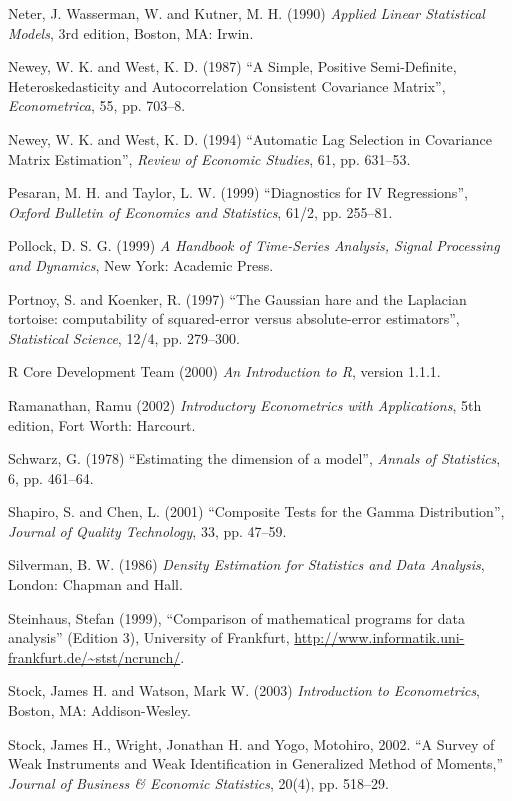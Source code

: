 \begin{thebibliography}
  Neter, J. Wasserman, W. and Kutner, M. H. (1990) \emph{Applied
    Linear Statistical Models}, 3rd edition, Boston, MA: Irwin.

  Newey, W. K. and West, K. D. (1987) ``A Simple, Positive
  Semi-Definite, Heteroskedasticity and Autocorrelation Consistent
  Covariance Matrix'', \emph{Econometrica}, 55, pp. 703--8.

  Newey, W. K. and West, K. D. (1994) ``Automatic Lag Selection in
  Covariance Matrix Estimation'', \emph{Review of Economic Studies},
  61, pp. 631--53.

  Pesaran, M. H. and Taylor, L. W. (1999) ``Diagnostics for IV
  Regressions'', \emph{Oxford Bulletin of Economics and Statistics},
  61/2, pp. 255--81.

  Pollock, D. S. G. (1999) \emph{A Handbook of Time-Series Analysis,
    Signal Processing and Dynamics}, New York: Academic Press.

  Portnoy, S. and Koenker, R. (1997) ``The Gaussian hare and the
  Laplacian tortoise: computability of squared-error versus
  absolute-error estimators'', \emph{Statistical Science}, 12/4,
  pp. 279--300.
  
  R Core Development Team (2000) \emph{An Introduction to R}, version
  1.1.1.

  Ramanathan, Ramu (2002) \emph{Introductory Econometrics with
    Applications}, 5th edition, Fort Worth: Harcourt.
  
  Schwarz, G. (1978) ``Estimating the dimension of a model'',
  \textit{Annals of Statistics}, 6, pp. 461--64.
  
  Shapiro, S. and Chen, L. (2001) ``Composite Tests for the Gamma
  Distribution'', \emph{Journal of Quality Technology}, 33, pp.
  47--59.
    
  Silverman, B. W. (1986) \emph{Density Estimation for Statistics and
    Data Analysis}, London: Chapman and Hall.

  Steinhaus, Stefan (1999), ``Comparison of mathematical programs for
  data analysis'' (Edition 3), University of Frankfurt, 
  \url{http://www.informatik.uni-frankfurt.de/~stst/ncrunch/}.
  
  Stock, James H. and Watson, Mark W. (2003) \emph{Introduction to
    Econometrics}, Boston, MA: Addison-Wesley.

  Stock, James H., Wright, Jonathan H. and Yogo, Motohiro, 2002. ``A
  Survey of Weak Instruments and Weak Identification in Generalized
  Method of Moments,'' \emph{Journal of Business \& Economic
    Statistics}, 20(4), pp. 518--29.


\end{thebibliography}
